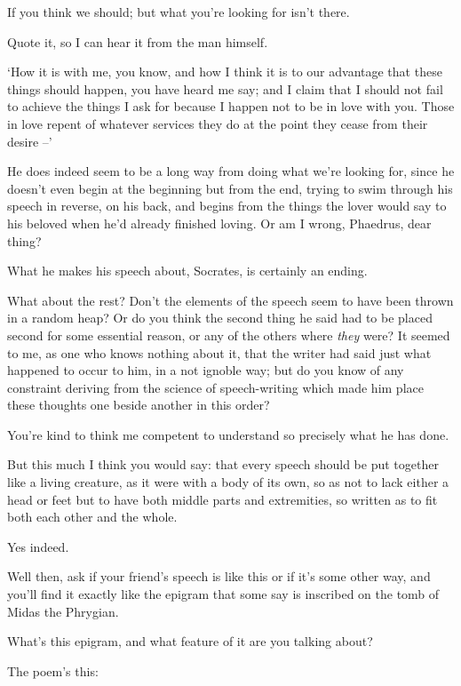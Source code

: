 If you think we should; but what you're looking for isn't
there.

 Quote it, so I can hear it from the man himself.

‘How it is with me, you know, and how I think it is to our
advantage that these things should happen, you have  heard me
say; and I claim that I should not fail to achieve the things I ask for
because I happen not to be in love with you. Those in love repent of
whatever services they do at the point they cease from their desire --'

He does indeed seem to be a long way from doing  what
we're looking for, since he doesn't even begin at the beginning but from
the end, trying to swim through his speech in reverse, on his back, and
begins from the things the lover would say to his beloved when he'd
already finished loving. Or am I wrong, Phaedrus, dear
thing?

 What he makes his speech about, Socrates, is certainly
an ending.

What about the rest? Don't the elements of the speech seem to
have been thrown in a random heap? Or do you  think the second
thing he said had to be placed second for some essential reason, or any
of the others where {\em they} were? It seemed to me, as one who knows
nothing about it, that the writer had said just what happened to occur
to him, in a not ignoble way; but do you know of any constraint deriving
from the science of speech-writing which made him place these thoughts
one beside another in this order?

You're kind to think me competent to understand  so
precisely what he has done.

But this much I think you would say: that every speech should
be put together like a living creature, as it were with a body of its
own, so as not to lack either a head or feet  but to have both
middle parts and extremities, so written as to fit both each other and
the whole.

Yes indeed.

Well then, ask if your friend's speech is like this or if it's
some other way, and you'll find it exactly like the epigram that some
say is inscribed on the tomb of Midas the
Phrygian.

What's this epigram, and what feature of it are you 
talking about?

The poem's this:

